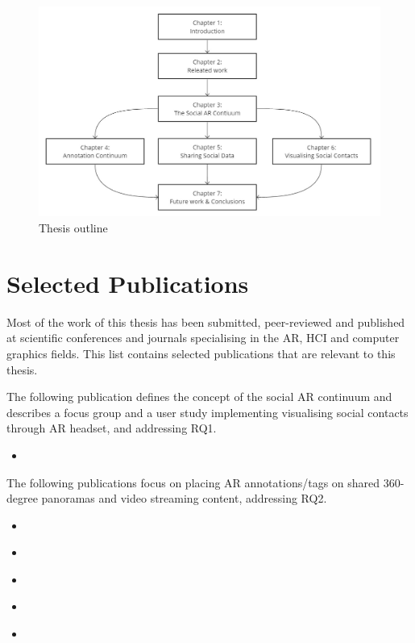 \begin{figure}
    \centering
    \includegraphics[width=\linewidth]{images/thesis-outline.png}
    \caption{Thesis outline}
    \label{fig:thesis-outline}
\end{figure}

\section{Selected Publications}

Most of the work of this thesis has been submitted, peer-reviewed and published at scientific conferences and journals specialising in the AR, HCI and computer graphics fields. This list contains selected publications that are relevant to this thesis. 

The following publication defines the concept of the social AR continuum and describes a focus group and a user study implementing visualising social contacts through AR headset, and addressing RQ1. 

\begin{itemize}
    \item{ }
\end{itemize}

The following publications focus on placing AR annotations/tags on shared 360-degree panoramas and video streaming content, addressing RQ2.

\begin{itemize}
    \item{ }
    \item{ }
    \item{ }    
    \item{ }
    \item{ }
\end{itemize}

